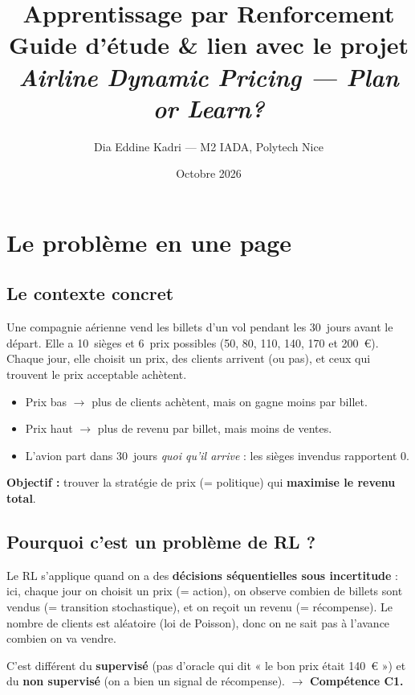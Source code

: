 \documentclass[11pt,a4paper]{article}
\title{\textbf{Apprentissage par Renforcement}\\[4pt]
       Guide d'étude \& lien avec le projet\\
       \large\textit{Airline Dynamic Pricing — Plan or Learn?}}
\author{Dia Eddine Kadri — M2 IADA, Polytech Nice}
\date{Octobre 2026}
\begin{document}
\maketitle
\tableofcontents
\newpage

\section{Le problème en une page}

\subsection{Le contexte concret}

Une compagnie aérienne vend les billets d'un vol pendant les 30~jours avant le départ. Elle a 10~sièges et 6~prix possibles (50, 80, 110, 140, 170 et 200~€). Chaque jour, elle choisit un prix, des clients arrivent (ou pas), et ceux qui trouvent le prix acceptable achètent.

\begin{itemize}[nosep]
  \item Prix bas $\to$ plus de clients achètent, mais on gagne moins par billet.
  \item Prix haut $\to$ plus de revenu par billet, mais moins de ventes.
  \item L'avion part dans 30~jours \emph{quoi qu'il arrive} : les sièges invendus rapportent 0.
\end{itemize}

\textbf{Objectif :} trouver la stratégie de prix (= politique) qui \textbf{maximise le revenu total}.

\subsection{Pourquoi c'est un problème de RL ?}

\begin{defbox}
Le RL s'applique quand on a des \textbf{décisions séquentielles sous incertitude} : ici, chaque jour on choisit un prix (= action), on observe combien de billets sont vendus (= transition stochastique), et on reçoit un revenu (= récompense). Le nombre de clients est aléatoire (loi de Poisson), donc on ne sait pas à l'avance combien on va vendre.

C'est différent du \textbf{supervisé} (pas d'oracle qui dit « le bon prix était 140~€ ») et du \textbf{non supervisé} (on a bien un signal de récompense). $\to$ \textbf{Compétence C1.}
\end{defbox}
\end{document}
